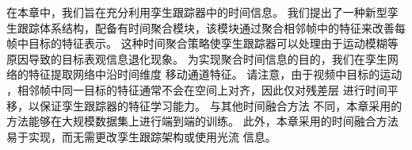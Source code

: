 在本章中，我们旨在充分利用孪生跟踪器中的时间信息。
我们提出了一种新型孪生跟踪体系结构，配备有时间聚合模块，该模块通过聚合相邻帧中的特征来改善每帧中目标的特征表示。
这种时间聚合策略使孪生跟踪器可以处理由于运动模糊等原因导致的目标表观信息退化现象。
为实现聚合时间信息的目的，我们在孪生网络的特征提取网络中沿时间维度 \cite{lin2019tsm} 移动通道特征。
请注意，由于视频中目标的运动 \cite{zhu2017flow}，相邻帧中同一目标的特征通常不会在空间上对齐，因此仅对残差层 \cite{lin2019tsm} 进行时间平移，以保证孪生跟踪器的特征学习能力。
与其他时间融合方法 \cite{tao2016siamese, gladh2016deep} 不同，本章采用的方法能够在大规模数据集上进行端到端的训练。
此外，本章采用的时间融合方法易于实现，而无需更改孪生跟踪架构或使用光流 \cite{zhu2018end} 信息。

